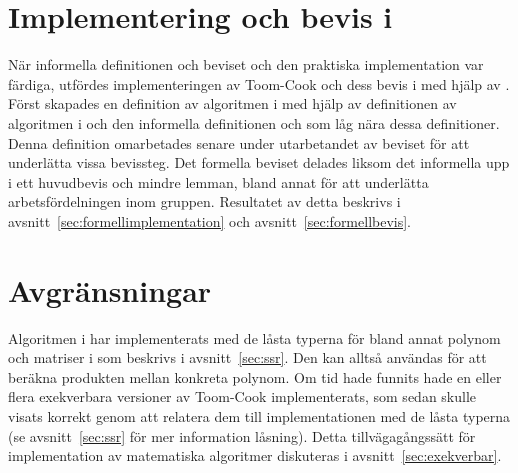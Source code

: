 \section{Implementering och bevis i \coq{}}
När informella definitionen och beviset och den praktiska implementation var
färdiga, utfördes implementeringen av Toom-Cook och dess bevis i \coq{} med
hjälp av \ssr{}. Först skapades en definition av algoritmen i \coq{} med hjälp
av definitionen av algoritmen i \haskell{} och den informella definitionen och
som låg nära dessa definitioner. Denna definition omarbetades senare under
utarbetandet av beviset för att underlätta vissa bevissteg. Det formella
beviset delades liksom det informella upp i ett huvudbevis och mindre lemman,
bland annat för att underlätta arbetsfördelningen inom gruppen. Resultatet av
detta beskrivs i avsnitt~\ref{sec:formellimplementation} och
avsnitt~\ref{sec:formellbevis}.

\section{Avgränsningar}
Algoritmen i \coq{} har implementerats med de låsta typerna för bland annat
polynom och matriser i \ssr{} som beskrivs i avsnitt~\ref{sec:ssr}. Den kan
alltså användas för att beräkna produkten mellan konkreta polynom. Om tid hade
funnits hade en eller flera exekverbara versioner av Toom-Cook implementerats,
som sedan skulle visats korrekt genom att relatera dem till implementationen
med de låsta typerna (se avsnitt~\ref{sec:ssr} för mer information låsning).
Detta tillvägagångssätt för implementation av matematiska algoritmer diskuteras
i avsnitt~\ref{sec:exekverbar}.

